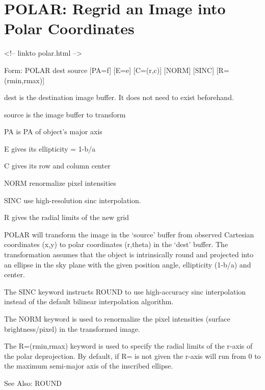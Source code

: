 \section{POLAR: Regrid an Image into Polar Coordinates}
\begin{rawhtml}
<!-- linkto polar.html -->
\end{rawhtml}
\begin{command}
  \item[Form: POLAR dest source {[PA=f]} {[E=e]} {[C=(r,c)]} {[NORM]} 
       {[SINC]} {[R=(rmin,rmax)]}\hfill]{}
  \item[dest]{is the destination image buffer. It does not need
       to exist beforehand.}
  \item[source]{is the image buffer to transform}
  \item[PA]{is PA of object's major axis}
  \item[E]{gives its ellipticity = 1-b/a}
  \item[C]{gives its row and column center}
  \item[NORM]{renormalize pixel intensities}
  \item[SINC]{use high-resolution sinc interpolation.}
  \item[R]{gives the radial limits of the new grid}
\end{command}

POLAR will transform the image in the `source' buffer from observed
Cartesian coordinates (x,y) to polar coordinates (r,theta) in the `dest'
buffer.  The transformation assumes that the object is intrinsically round
and projected into an ellipse in the sky plane with the given position
angle, ellipticity (1-b/a) and center.

The SINC keyword instructs ROUND to use high-accuracy sinc interpolation
instead of the default bilinear interpolation algorithm.  

The NORM keyword is used to renormalize the pixel intensities (surface
brightness/pixel) in the transformed image.

The R=(rmin,rmax) keyword is used to specify the radial limits of the
r-axis of the polar deprojection.  By default, if R= is not given the
r-axis will run from 0 to the maximum semi-major axis of the inscribed
ellipse.

See Also: ROUND


